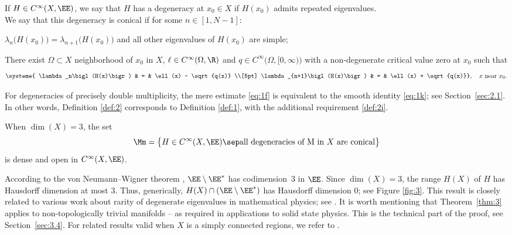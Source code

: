 \begin{defi}\label{def:2} If $H \in C^\infty(X,\EE)$, we say that $H$ has a degeneracy at $x_0 \in X$ if $H(x_0)$ admits repeated eigenvalues.\\
\indent We say that this degeneracy is conical if for some $n \in [1,N-1]$:
\begin{enumeratei}
\item\label{def:2i}
$\lambda_n\bigl( H(x_0) \bigr) = \lambda_{n+1}\bigl( H(x_0) \bigr)$ and all other eigenvalues of $H(x_0)$ are simple;
\item\label{def:2ii}
There exist $\Omega \subset X$ neighborhood of $x_0$ in $X$, $\ell \in C^\infty(\Omega,\R)$ and $q \in C^\infty\bigl(\Omega,[0,\infty)\bigr)$ with a non-degenerate critical value zero at $x_0$ such that
\begin{equation}\label{eq:1k}
\systeme{
\lambda_n\bigl(H(x)\bigr) & = & \ell(x) - \sqrt{q(x)}
\\[5pt]
\lambda_{n+1}\bigl(H(x)\bigr) & = & \ell(x) + \sqrt{q(x)}}, \quad x \text{ near } x_0.
\end{equation}
\end{enumeratei}
\end{defi}

For degeneracies of precisely double multiplicity, the mere estimate \eqref{eq:1f} is equivalent to the smooth identity \eqref{eq:1k}; see Section~\ref{sec:2.1}. In other words, Definition \ref{def:2} corresponds to Definition \ref{def:1}, with the additional requirement \eqref{def:2i}.

\begin{theorem}\label{thm:2} When $\dim(X) = 3$, the set
\begin{equation}\label{eq:1o}
\Mm = \bigl\{ H \in C^\infty(X,\EE) \sep \text{all degeneracies of M in $X$ are conical} \bigr\}
\end{equation}
is dense and open in $C^\infty(X,\EE)$.
\end{theorem}

According to the von Neumann--Wigner theorem \cite{NW29}, $\EE \setminus \EE^*$ has codimension~$3$ in $\EE$. Since $\dim(X) = 3$, the range $H(X)$ of $H$ has Hausdorff dimension at most $3$. Thus, generically, $H(X) \cap \left( \EE \setminus \EE^*\right)$ has Hausdorff dimension $0$; see Figure \ref{fig:3}. This result is closely related to various work about rarity of degenerate eigenvalues in mathematical physics; see \eg \cite{C91,A95,T99}.
It is worth mentioning that Theorem~\ref{thm:3} applies to non-topologically trivial manifolds -- as required in applications to solid state physics. This is the technical part of the proof, see Section~\ref{sec:3.4}. For related results valid when $X$ is a simply connected regions, we refer to \cite[\S4]{DP12}.

